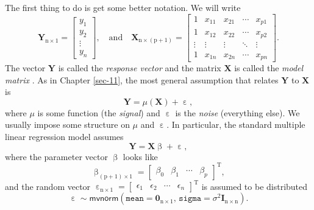 \documentclass[captions=tableheading]{scrbook}
\begin{document}
The first thing to do is get some better notation. We will write 
\begin{equation}
\mathbf{Y}_{\mathrm{n}\times1}=
\begin{bmatrix}y_{1}\\
y_{2}\\
\vdots\\
y_{n}
\end{bmatrix},
\quad \mbox{and}\quad \mathbf{X}_{\mathrm{n}\times(\mathrm{p}+1)}=
\begin{bmatrix}1 & x_{11} & x_{21} & \cdots & x_{p1}\\
1 & x_{12} & x_{22} & \cdots & x_{p2}\\
\vdots & \vdots & \vdots & \ddots & \vdots\\
1 & x_{1n} & x_{2n} & \cdots & x_{pn}
\end{bmatrix}.
\end{equation}
The vector \(\mathbf{Y}\) is called the \emph{response vector}  and the matrix \(\mathbf{X}\) is called the \emph{model matrix} . As in Chapter \ref{sec-11}, the most general assumption that relates \(\mathbf{Y}\) to \(\mathbf{X}\) is
\begin{equation}
\mathbf{Y}=\mu(\mathbf{X})+\upepsilon,
\end{equation}
where \(\mu\) is some function (the \emph{signal}) and \(\upepsilon\) is the \emph{noise} (everything else). We usually impose some structure on \(\mu\) and \(\upepsilon\). In particular, the standard multiple linear regression model assumes
\begin{equation}
\mathbf{Y}=\mathbf{X}\upbeta+\upepsilon,
\end{equation}
where the parameter vector \(\upbeta\) looks like 
\begin{equation}
\upbeta_{(\mathrm{p}+1)\times1}=\begin{bmatrix}\beta_{0} & \beta_{1} & \cdots & \beta_{p}\end{bmatrix}^{\mathrm{T}},
\end{equation}
and the random vector \(\upepsilon_{\mathrm{n}\times1}=\begin{bmatrix}\epsilon_{1} & \epsilon_{2} & \cdots & \epsilon_{n}\end{bmatrix}^{\mathrm{T}}\) is assumed to be distributed
\begin{equation}
\upepsilon\sim\mathsf{mvnorm}\left(\mathtt{mean}=\mathbf{0}_{\mathrm{n}\times1},\,\mathtt{sigma}=\sigma^{2}\mathbf{I}_{\mathrm{n}\times\mathrm{n}}\right).
\end{equation}
\end{document}
